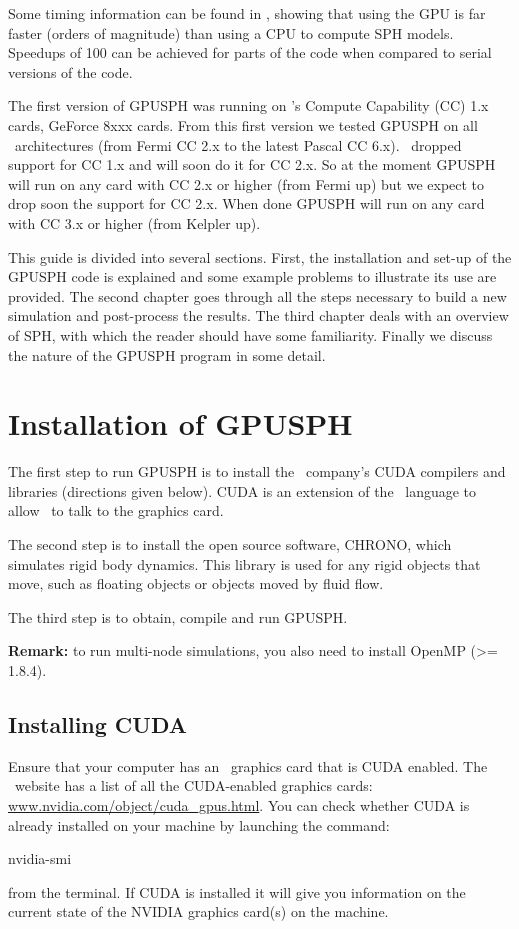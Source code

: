 \documentclass{../GPUSPHtemplate}
\begin{document}
Some timing information can be found in \cite{herault_sph_2010}, 
showing that using the GPU is far faster (orders
of magnitude) than using a CPU to compute SPH models. Speedups of 100
can be achieved for parts of the code when compared to serial versions
of the code.

The first version of GPUSPH was running  on \nvidia's Compute Capability (CC) 1.x cards, 
GeForce 8xxx cards. From this first version we tested GPUSPH on all \nvidia\  architectures
(from Fermi CC 2.x to the latest Pascal CC 6.x). \nvidia\  dropped support for CC 1.x and will 
soon do it for CC 2.x. So at the moment GPUSPH will run on any card with CC 2.x or higher
(from Fermi up) but we expect to drop soon the support for CC 2.x. When done GPUSPH will
run on any card with CC 3.x or higher (from Kelpler up).

This guide is divided into several sections. 
First, the installation and set-up of the GPUSPH code is explained and 
some example problems to illustrate its use are provided.
The second chapter goes through all the steps necessary to build a new
simulation and post-process the results.
The third chapter deals with an overview of SPH, with which the reader should
have some familiarity. 
Finally we discuss the nature of the GPUSPH program in some detail.

\section{Installation of GPUSPH}

The first step to run GPUSPH is to install the \nvidia\ company's CUDA
compilers and libraries (directions given below). CUDA is an extension
of the \cpp\ language to allow \cpp\ to talk to the graphics card.

The second step is to install the open source software, CHRONO,
which simulates rigid body dynamics. This library is used for
any rigid objects that move, such as floating objects or objects moved
by fluid flow.

The third step is to obtain, compile and run GPUSPH.

\textbf{Remark:} to run multi-node simulations, you also need to
install OpenMP (>= 1.8.4).

\subsection{Installing CUDA}

Ensure that your computer has an \nvidia\ graphics card that is CUDA
enabled. The \nvidia\ website has a list of all the CUDA-enabled graphics
cards: \url{www.nvidia.com/object/cuda_gpus.html}. You can check whether
CUDA is already installed on your machine by launching the command:
\begin{shellcode}
nvidia-smi
\end{shellcode}
from the terminal. If CUDA is installed it will give you information
on the current state of the NVIDIA graphics card(s) on the machine.
\end{document}

